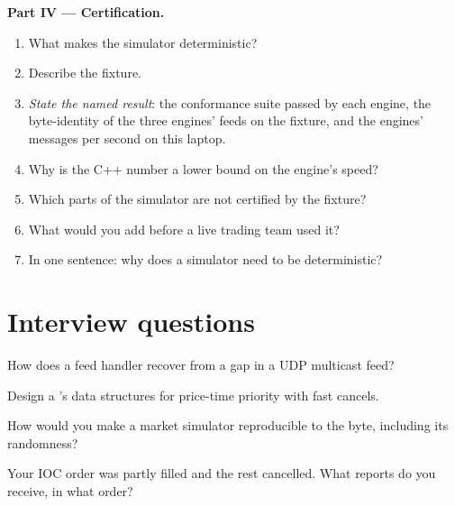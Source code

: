 \begin{problem}
\medskip\noindent\textbf{Part IV --- Certification.}
\begin{enumerate}[resume]
\item What makes the simulator deterministic?
\item Describe the fixture.
\item \emph{State the named result}: the conformance suite passed by each engine, the byte-identity of the three engines' feeds on the fixture, and the
engines' messages per second on this laptop.
\item Why is the C++ number a lower bound on the engine's speed?
\item Which parts of the simulator are not certified by the fixture?
\item What would you add before a live trading team used it?
\item In one sentence: why does a simulator need to be deterministic?
\end{enumerate}
\end{problem}

\section{Interview questions}

\begin{interviewq}\label{iq:mx:build-a-matching-engine-and-exchange-simulator:1}
How does a feed handler recover from a gap in a UDP multicast feed?
\end{interviewq}

\begin{interviewq}\label{iq:mx:build-a-matching-engine-and-exchange-simulator:2}
Design a 's data structures for price-time priority with fast cancels.
\end{interviewq}

\begin{interviewq}\label{iq:mx:build-a-matching-engine-and-exchange-simulator:3}
How would you make a market simulator reproducible to the byte, including its randomness?
\end{interviewq}

\begin{interviewq}\label{iq:mx:build-a-matching-engine-and-exchange-simulator:4}
Your IOC order was partly filled and the rest cancelled. What reports do you receive, in what order?
\end{interviewq}

